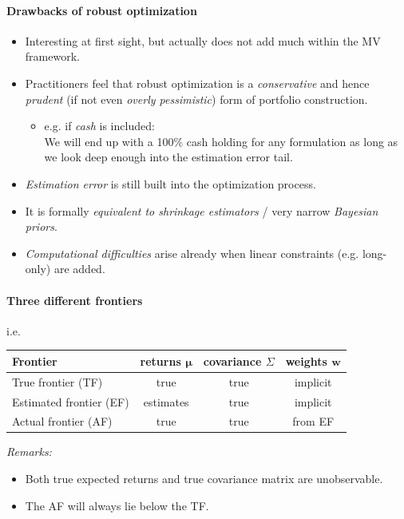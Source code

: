 \documentclass[a4paper,landscape,8pt,fleqn]{scrartcl}
\begin{document}
\begin{multicols*}{3}
\paragraph{Drawbacks of robust optimization}
\begin{itemize}
\item Interesting at first sight, but actually does not add much within the MV framework.
\item Practitioners feel that robust optimization is a \textit{conservative} and hence \textit{prudent} (if not even \textit{overly pessimistic}) form of portfolio construction.
\begin{itemize}
\item e.g. if \textit{cash} is included: \\
We will end up with a 100\% cash holding for any formulation as long as we look deep enough into the estimation error tail.
\end{itemize}
\item \textit{Estimation error} is still built into the optimization process.
\item It is formally \textit{equivalent to shrinkage estimators} / very narrow \textit{Bayesian priors}.
\item \textit{Computational difficulties} arise already when linear constraints (e.g. long-only) are added.
\end{itemize}

\paragraph{Three different frontiers}
i.e. \\
\begin{tabular}{l | c c c} \toprule
Frontier & returns $\bm \mu$ & covariance $\Sigma$ & weights $\bm w$ \\ \midrule
True frontier (TF) & true & true & implicit \\
Estimated frontier (EF) & estimates & true & implicit \\
Actual frontier (AF) & true & true & from EF \\ \bottomrule
\end{tabular}
\textit{Remarks:}
\begin{itemize}
\item Both true expected returns and true covariance matrix are unobservable.
\item The AF will always lie below the TF.
\end{itemize}


\end{multicols*}
\end{document}
